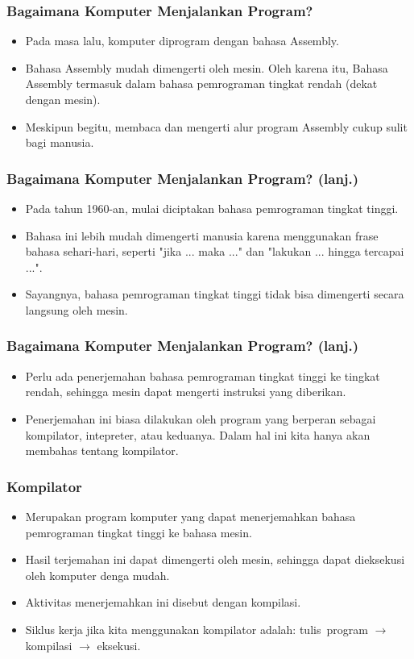 \begin{frame}
\frametitle{Bagaimana Komputer Menjalankan Program?}
\begin{itemize}
  \item Pada masa lalu, komputer diprogram dengan bahasa Assembly.
  \item Bahasa Assembly mudah dimengerti oleh mesin. Oleh karena itu, Bahasa Assembly termasuk dalam bahasa pemrograman tingkat rendah (dekat dengan mesin).
  \item Meskipun begitu, membaca dan mengerti alur program Assembly cukup sulit bagi manusia.
\end{itemize}
\end{frame}

\begin{frame}
\frametitle{Bagaimana Komputer Menjalankan Program? (lanj.)}
\begin{itemize}
  \item Pada tahun 1960-an, mulai diciptakan bahasa pemrograman tingkat tinggi.
  \item Bahasa ini lebih mudah dimengerti manusia karena menggunakan frase bahasa sehari-hari, seperti "jika ... maka ..." dan "lakukan ... hingga tercapai ...".
  \item Sayangnya, bahasa pemrograman tingkat tinggi tidak bisa dimengerti secara langsung oleh mesin.
\end{itemize}
\end{frame}

\begin{frame}
\frametitle{Bagaimana Komputer Menjalankan Program? (lanj.)}
\begin{itemize}
  \item Perlu ada penerjemahan bahasa pemrograman tingkat tinggi ke tingkat rendah, sehingga mesin dapat mengerti instruksi yang diberikan.
  \item Penerjemahan ini biasa dilakukan oleh program yang berperan sebagai kompilator, intepreter, atau keduanya. Dalam hal ini kita hanya akan membahas tentang kompilator.
\end{itemize}
\end{frame}

\begin{frame}
\frametitle{Kompilator}
\begin{itemize}
  \item Merupakan program komputer yang dapat menerjemahkan bahasa pemrograman tingkat tinggi ke bahasa mesin.
  \item Hasil terjemahan ini dapat dimengerti oleh mesin, sehingga dapat dieksekusi oleh komputer denga mudah.
  \item Aktivitas menerjemahkan ini disebut dengan kompilasi.
  \item Siklus kerja jika kita menggunakan kompilator adalah: tulis~program $\rightarrow$ kompilasi $\rightarrow$ eksekusi.
\end{itemize}
\end{frame}

